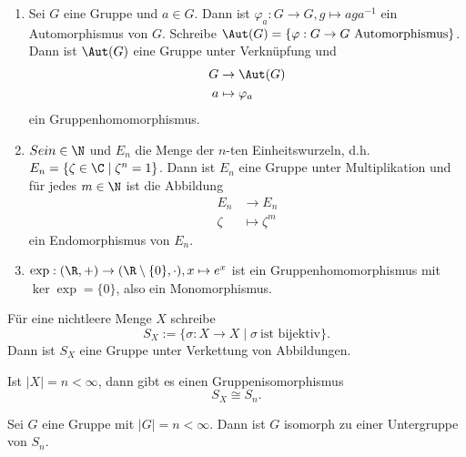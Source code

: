 \begin{exmp*}
	\begin{enumerate}[label=({\roman*})]
	\item Sei $G$ eine Gruppe und $a \in G$. Dann ist $ \varphi_a : G \to G, g \mapsto aga^{-1} $ ein Automorphismus von $G$. Schreibe $ \Aut(G) = \{\varphi: G \to G\ \text{Automorphismus}\} $. Dann ist $ \Aut(G) $ eine Gruppe unter Verknüpfung und 
		\begin{align*}
			G &\to \Aut(G)\\
			a &\mapsto \varphi_a
		\end{align*}
		ein Gruppenhomomorphismus.
	
	\item $ Sei n \in \N $ und $ E_n $ die Menge der $n$-ten Einheitswurzeln, d.h. $ E_n = \{ \zeta \in \C \mid \zeta^n = 1\} $. Dann ist $E_n$ eine Gruppe unter Multiplikation und für jedes $m \in \N$ ist die Abbildung 
		\begin{align*}
			E_n &\to E_n\\
			\zeta &\mapsto \zeta^m
		\end{align*}
		ein Endomorphismus von $E_n$.
		
	\item $ \exp: (\R,+) \to (\R\setminus\{0\}, \cdot), x \mapsto e^x $ ist ein Gruppenhomomorphismus mit $ \ker \exp = \{0\} $, also ein Monomorphismus.
	\end{enumerate}
\end{exmp*}

\begin{notat*}
	Für eine nichtleere Menge $X$ schreibe
	\[ S_X := \{\sigma: X \to X \mid \sigma \ \text{ist bijektiv}\}. \]
	Dann ist $S_X$ eine Gruppe unter Verkettung von Abbildungen.
\end{notat*}

\begin{rem*}
	Ist $|X| = n < \infty$, dann gibt es einen Gruppenisomorphismus $$ S_X \cong S_n. $$
\end{rem*}

\begin{thm}
	Sei $G$ eine Gruppe mit $|G|=n<\infty$. Dann ist $G$ isomorph zu einer Untergruppe von $S_n$.
\end{thm}
